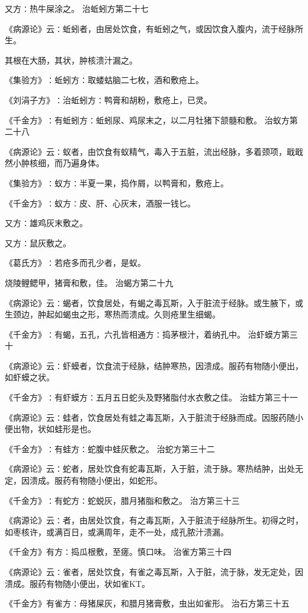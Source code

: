 \documentclass[a4paper,12pt,UTF8,twoside]{ctexbook}
\begin{document}
又方∶热牛屎涂之。
治蚯蚓方第二十七

《病源论》云∶蚯蚓者，由居处饮食，有蚯蚓之气，或因饮食入腹内，流于经脉所生。

其根在大肠，其状，肿核溃汁漏之。

《集验方》∶蚯蚓方∶取蝼蛄脑二七枚，酒和敷疮上。

《刘涓子方》∶治蚯蚓方∶鸭膏和胡粉，敷疮上，已灵。

《千金方》∶有蚯蚓方∶蚯蚓尿、鸡尿末之，以二月牡猪下颔髓和敷。
治蚁方第二十八

《病源论》云∶蚁者，由饮食有蚁精气，毒入于五脏，流出经脉，多着颈项，戢戢然小肿核细，而乃遍身体。

《集验方》∶蚁方∶半夏一果，捣作屑，以鸭膏和，敷疮上。

《千金方》∶蚁方∶皮、肝、心灰末，酒服一钱匕。

又方∶雄鸡灰末敷之。

又方∶鼠灰敷之。

《葛氏方》∶若疮多而孔少者，是蚁。

烧陵鲤鳃甲，猪膏和敷，佳。
治蝎方第二十九

《病源论》云∶蝎者，饮食居处，有蝎之毒瓦斯，入于脏流于经脉。或生腋下，或生颈边，肿起如蝎虫之形，寒热而溃成。久则疮里生细蝎。

《千金方》∶有蝎，五孔，六孔皆相通方∶捣茅根汁，着纳孔中。
治虾蟆方第三十

《病源论》云∶虾蟆者，饮食流于经脉，结肿寒热，因溃成。服药有物随小便出，如虾蟆之状。

《千金方》∶有虾蟆方∶五月五日蛇头及野猪脂付水衣敷之佳。
治蛙方第三十一

《病源论》云∶蛙者，饮食居处有蛙之毒瓦斯，入于脏流于经脉而成。因服药随小便出物，状如蛙形是也。

《千金方》∶有蛙方∶蛇腹中蛙灰敷之。
治蛇方第三十二

《病源论》云∶蛇者，居处饮食有蛇毒瓦斯，入于脏，流于脉。寒热结肿，出处无定，因溃成。服药有物随小便出，如蛇形。

《千金方》∶有蛇方∶蛇蜕灰，腊月猪脂和敷之。
治方第三十三

《病源论》云∶者，由居处饮食，有之毒瓦斯，入于脏流于经脉所生。初得之时，如枣核许，或满百日，或满周年，走不一处，成孔脓汁溃漏。

《千金方》有方∶捣瓜根敷，至瘥。慎口味。
治雀方第三十四

《病源论》云∶雀者，居处饮食，有雀之毒瓦斯，入于脏，流于脉，发无定处，因溃成。服药有物随小便出，状如雀KT。

《千金方》有雀方∶母猪屎灰，和腊月猪膏敷，虫出如雀形。
治石方第三十五
\end{document}
